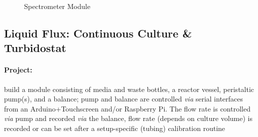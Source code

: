 \documentclass[12pt,a4paper]{scrartcl}
\begin{document}
\begin{figure}[ht]
  \begin{minipage}{.49\textwidth}
  \end{minipage}
  \begin{minipage}{.49\textwidth}
  \end{minipage}
\caption[]{Spectrometer Module}
\end{figure}

\newpage
\subsection{Liquid Flux: Continuous Culture \& Turbidostat} 
\label{cult}

\paragraph{Project:} build a module consisting of media and waste bottles, a reactor vessel, peristaltic pump(s), and a balance; pump and balance are controlled  \textit{via} serial interfaces from  an Arduino+Touchscreen and/or
Raspberry Pi. The flow rate is controlled \textit{via} pump and
recorded \textit{via} the balance, flow rate (depends on culture
volume) is recorded or can be set after a setup-specific (tubing)
calibration routine
\end{document}
